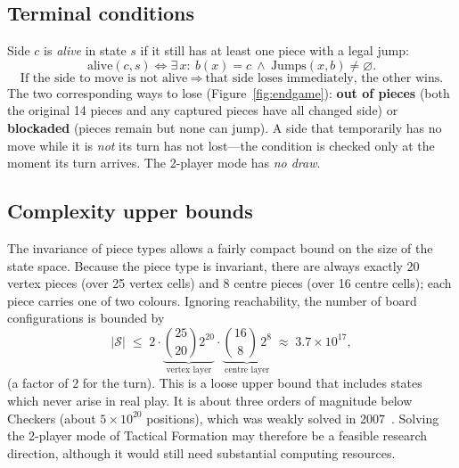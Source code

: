 \subsection{Terminal conditions}
\label{ssec:terminal}

Side $c$ is \emph{alive} in state $s$ if it still has at least one piece
with a legal jump:
\begin{equation}
\mathrm{alive}(c,s)\iff \exists\,x:\ b(x)=c\ \wedge\ \mathrm{Jumps}(x,b)\neq\varnothing.
\label{eq:alive}
\end{equation}
\begin{equation}
\boxed{\;\text{If the side to move is not alive}
\ \Rightarrow\ \text{that side loses immediately, the other wins.}\;}
\label{eq:terminal}
\end{equation}
The two corresponding ways to lose (Figure~\ref{fig:endgame}): \textbf{out
of pieces} (both the original 14 pieces and any captured pieces have all
changed side) or \textbf{blockaded} (pieces remain but none can jump). A
side that temporarily has no move while it is \emph{not} its turn has not
lost---the condition is checked only at the moment its turn arrives. The
2-player mode has \emph{no draw}.

\subsection{Complexity upper bounds}
\label{ssec:complexity}

The invariance of piece types allows a fairly compact bound
on the size of the state space. Because the piece type is invariant, there
are always exactly 20 vertex pieces (over 25 vertex cells) and 8 centre
pieces (over 16 centre cells); each piece carries one of two colours.
Ignoring reachability, the number of board configurations is bounded by
\begin{equation}
|\mathcal S| \;\le\; 2\cdot
\underbrace{\binom{25}{20}2^{20}}_{\text{vertex layer}}\cdot
\underbrace{\binom{16}{8}\,2^{8}}_{\text{centre layer}}
\;\approx\; 3.7\times10^{17},
\label{eq:statespace}
\end{equation}
(a factor of $2$ for the turn). This is a loose upper bound that includes
states which never arise in real play. It is about three orders of magnitude
below Checkers (about $5\times10^{20}$ positions), which was weakly solved in
2007~\citep{schaeffer2007checkers}. Solving the 2-player mode of Tactical Formation
may therefore be a feasible research direction, although it would still need
substantial computing resources.

